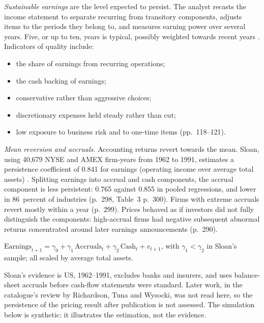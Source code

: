 \begin{qfmethod}\label{meth:earnings-quality-persistence}
 \emph{Sustainable earnings} are the level expected to persist. The analyst recasts the income statement to separate recurring from transitory components, adjusts items to the periods they belong to, and measures earning power over several years. Five, or up to ten, years is typical, possibly weighted towards recent years \citep[pp.~602--603, 617]{financial-statement-analysis-2009}. Indicators of quality include:
\begin{itemize}
\item the share of earnings from recurring operations;
\item the cash backing of earnings;
\item conservative rather than aggressive choices;
\item discretionary expenses held steady rather than cut;
\item low exposure to business risk and to one-time items (pp.~118--121).
\end{itemize}

\emph{Mean reversion and accruals.} Accounting returns revert towards the mean. Sloan, using 40{,}679 NYSE and AMEX firm-years from 1962 to 1991, estimates a persistence coefficient of 0.841 for earnings (operating income over average total assets) \citep[pp.~293 and~298]{wide-sloan-accruals}. Splitting earnings into accrual and cash components, the accrual component is less persistent: 0.765 against 0.855 in pooled regressions, and lower in 86~percent of industries (p.~298, Table~3 p.~300). Firms with extreme accruals revert mostly within a year (p.~299). Prices behaved as if investors did not fully distinguish the components: high-accrual firms had negative subsequent abnormal returns concentrated around later earnings announcements (p.~290).

 $\text{Earnings}_{t+1}=\gamma_0+\gamma_1\,\text{Accruals}_t+\gamma_2\,\text{Cash}_t+v_{t+1}$, with $\gamma_1<\gamma_2$ in Sloan's sample; all scaled by average total assets.

 Sloan's evidence is US, 1962--1991, excludes banks and insurers, and uses balance-sheet accruals before cash-flow statements were standard. Later work, in the catalogue's review by Richardson, Tuna and Wysocki, was not read here, so the persistence of the pricing result after publication is not assessed. The simulation below is synthetic: it illustrates the estimation, not the evidence.


\end{qfmethod}
